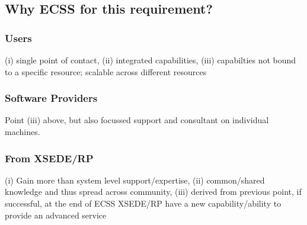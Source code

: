 \documentclass{sig-alternate}
\begin{document}
\subsection{Why ECSS for this requirement?}


\subsubsection{Users} (i) single point of contact, (ii) integrated capabilities,
(iii) capabilties not bound to a specific resource; scalable across
different resources

\subsubsection{Software Providers} Point (iii) above, but also focussed support and
consultant on individual machines.

\subsubsection{From XSEDE/RP} (i) Gain more than system level support/expertise, (ii)
common/shared knowledge and thus spread across community, (iii)
derived from previous point, if successful, at the end of ECSS
XSEDE/RP have a new capability/ability to provide an advanced service
\end{document}
